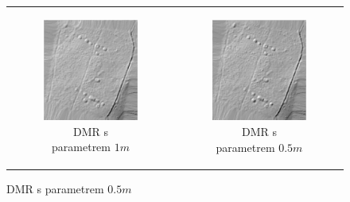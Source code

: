 \begin{figure}[H]
\begin{tabular}{cc}
        \begin{subfigure}[b]{0.35\textwidth}
            \centering
            \includegraphics[width=\textwidth]{images/IM_1m.png}
            \caption{DMR s parametrem $1 m$}
        \end{subfigure} &
        \begin{subfigure}[b]{0.35\textwidth}
            \centering
            \includegraphics[width=\textwidth]{images/IM_05m.png}
            \caption{DMR s parametrem $0.5 m$}
        \end{subfigure} \\


\end{tabular}
\end{figure}
